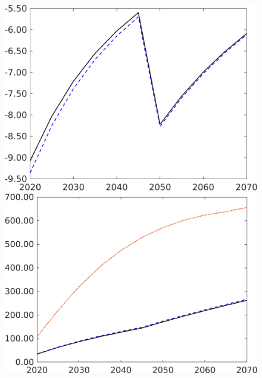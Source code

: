 \begin{figure}[h!!!]
\begin{minipage}[]{0.32\textwidth}
\end{minipage}
\begin{minipage}[]{0.32\textwidth}
\includegraphics[width=1\textwidth]{../../codding_model/own_basedOnFried/optimalPol_190722_tidiedUp/figures/all_10Aout22/snS_PercentageLfDynNT_noeff_Target_regime3_spillover0_noskill0_sep1_xgrowth0_PV1_etaa0.79_lgd0.png}
\end{minipage}
\begin{minipage}[]{0.32\textwidth}
	\includegraphics[width=1\textwidth]{../../codding_model/own_basedOnFried/optimalPol_190722_tidiedUp/figures/all_10Aout22/AgAf_PercentageLfDynNT_Target_regime3_spillover0_noskill0_sep1_xgrowth0_PV1_etaa0.79_lgd0.png}

\end{minipage}
\end{figure}
